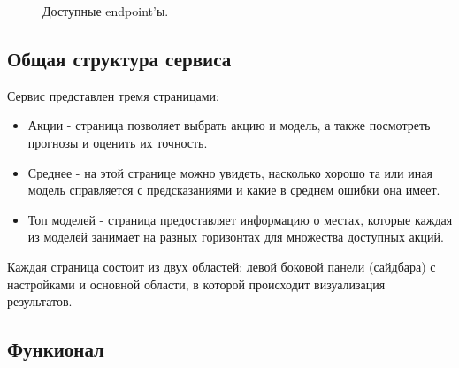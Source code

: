 \documentclass[12pt, a4paper]{article}
\begin{document}
\begin{figure}[!h]
\caption{Доступные endpoint'ы.}
\label{fig:api_endpoints}
\end{figure}

\subsection{Общая структура сервиса}

Сервис представлен тремя страницами:

\begin{itemize}
  \item Акции - страница позволяет выбрать акцию и модель, а также посмотреть прогнозы и оценить их точность.
  \item Среднее - на этой странице можно увидеть, насколько хорошо та или иная модель справляется с предсказаниями и какие в среднем ошибки она имеет.
  \item Топ моделей - страница предоставляет информацию о местах, которые каждая из моделей занимает на разных горизонтах для множества доступных акций.
\end{itemize}

Каждая страница состоит из двух областей: левой боковой панели
(сайдбара) с настройками и основной области, в которой происходит
визуализация результатов.

\subsection{Функионал}
\end{document}

